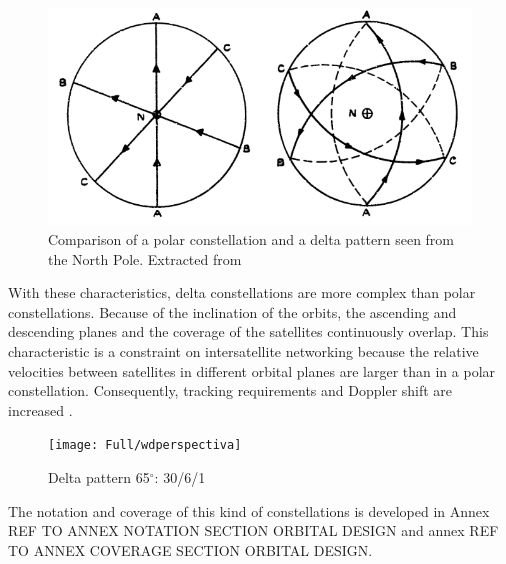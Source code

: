 \begin{figure}[H]
\centerline{\includegraphics[scale=0.4]{Full/polarvswalker.png}}
\caption{Comparison of a polar constellation and a delta pattern seen from the North Pole. Extracted from \cite{Walker1977}}
\label{fig:delta pattern North Pole}
\end{figure}

With these characteristics, delta constellations are more complex than polar constellations. Because of the inclination of the orbits, the ascending and descending planes and the coverage of the satellites continuously overlap. This characteristic is a constraint on intersatellite networking because the relative velocities between satellites in different orbital planes are larger than in a polar constellation. Consequently, tracking requirements and Doppler shift are increased \cite{Wood2001}.

\begin{figure}[H]
\centerline{\texttt{[image: Full/wdperspectiva]}}
\caption{Delta pattern 65$^{\circ}$: 30/6/1}
\label{fig:delta pattern notation}
\end{figure}

The notation and coverage of this kind of constellations is developed in Annex REF TO ANNEX NOTATION SECTION ORBITAL DESIGN and annex REF TO ANNEX COVERAGE SECTION ORBITAL DESIGN.